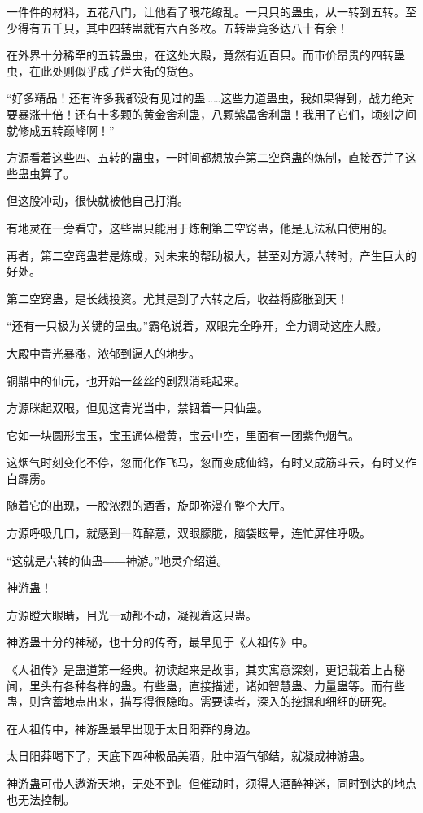 \begin{this_body}
一件件的材料，五花八门，让他看了眼花缭乱。一只只的蛊虫，从一转到五转。至少得有五千只，其中四转蛊就有六百多枚。五转蛊竟多达八十有余！

在外界十分稀罕的五转蛊虫，在这处大殿，竟然有近百只。而市价昂贵的四转蛊虫，在此处则似乎成了烂大街的货色。

“好多精品！还有许多我都没有见过的蛊……这些力道蛊虫，我如果得到，战力绝对要暴涨十倍！还有十多颗的黄金舍利蛊，八颗紫晶舍利蛊！我用了它们，顷刻之间就修成五转巅峰啊！”

方源看着这些四、五转的蛊虫，一时间都想放弃第二空窍蛊的炼制，直接吞并了这些蛊虫算了。

但这股冲动，很快就被他自己打消。

有地灵在一旁看守，这些蛊只能用于炼制第二空窍蛊，他是无法私自使用的。

再者，第二空窍蛊若是炼成，对未来的帮助极大，甚至对方源六转时，产生巨大的好处。

第二空窍蛊，是长线投资。尤其是到了六转之后，收益将膨胀到天！

“还有一只极为关键的蛊虫。”霸龟说着，双眼完全睁开，全力调动这座大殿。

大殿中青光暴涨，浓郁到逼人的地步。

铜鼎中的仙元，也开始一丝丝的剧烈消耗起来。

方源眯起双眼，但见这青光当中，禁锢着一只仙蛊。

它如一块圆形宝玉，宝玉通体橙黄，宝云中空，里面有一团紫色烟气。

这烟气时刻变化不停，忽而化作飞马，忽而变成仙鹤，有时又成筋斗云，有时又作白霹雳。

随着它的出现，一股浓烈的酒香，旋即弥漫在整个大厅。

方源呼吸几口，就感到一阵醉意，双眼朦胧，脑袋眩晕，连忙屏住呼吸。

“这就是六转的仙蛊――神游。”地灵介绍道。

神游蛊！

方源瞪大眼睛，目光一动都不动，凝视着这只蛊。

神游蛊十分的神秘，也十分的传奇，最早见于《人祖传》中。

《人祖传》是蛊道第一经典。初读起来是故事，其实寓意深刻，更记载着上古秘闻，里头有各种各样的蛊。有些蛊，直接描述，诸如智慧蛊、力量蛊等。而有些蛊，则含蓄地点出来，描写得很隐晦。需要读者，深入的挖掘和细细的研究。

在人祖传中，神游蛊最早出现于太日阳莽的身边。

太日阳莽喝下了，天底下四种极品美酒，肚中酒气郁结，就凝成神游蛊。

神游蛊可带人遨游天地，无处不到。但催动时，须得人酒醉神迷，同时到达的地点也无法控制。


\end{this_body}

